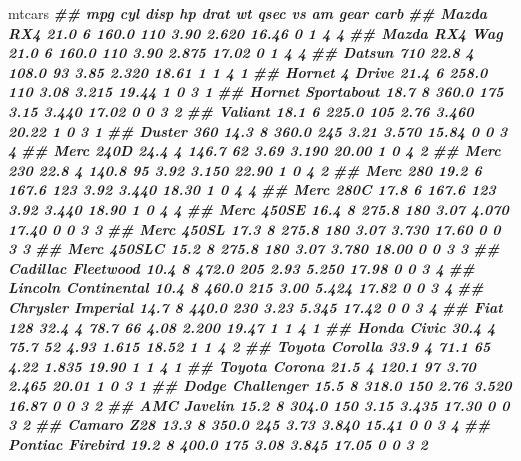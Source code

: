 \documentclass[
]{book}
\newenvironment{Shaded}{\begin{snugshade}}{\end{snugshade}}
\newcommand{\DocumentationTok}[1]{\textcolor[rgb]{0.56,0.35,0.01}{\textbf{\textit{#1}}}}
\newcommand{\NormalTok}[1]{#1}
\begin{document}
\begin{Shaded}
\begin{Highlighting}[]
\NormalTok{mtcars}
\DocumentationTok{\#\#                      mpg cyl  disp  hp drat    wt  qsec vs am gear carb}
\DocumentationTok{\#\# Mazda RX4           21.0   6 160.0 110 3.90 2.620 16.46  0  1    4    4}
\DocumentationTok{\#\# Mazda RX4 Wag       21.0   6 160.0 110 3.90 2.875 17.02  0  1    4    4}
\DocumentationTok{\#\# Datsun 710          22.8   4 108.0  93 3.85 2.320 18.61  1  1    4    1}
\DocumentationTok{\#\# Hornet 4 Drive      21.4   6 258.0 110 3.08 3.215 19.44  1  0    3    1}
\DocumentationTok{\#\# Hornet Sportabout   18.7   8 360.0 175 3.15 3.440 17.02  0  0    3    2}
\DocumentationTok{\#\# Valiant             18.1   6 225.0 105 2.76 3.460 20.22  1  0    3    1}
\DocumentationTok{\#\# Duster 360          14.3   8 360.0 245 3.21 3.570 15.84  0  0    3    4}
\DocumentationTok{\#\# Merc 240D           24.4   4 146.7  62 3.69 3.190 20.00  1  0    4    2}
\DocumentationTok{\#\# Merc 230            22.8   4 140.8  95 3.92 3.150 22.90  1  0    4    2}
\DocumentationTok{\#\# Merc 280            19.2   6 167.6 123 3.92 3.440 18.30  1  0    4    4}
\DocumentationTok{\#\# Merc 280C           17.8   6 167.6 123 3.92 3.440 18.90  1  0    4    4}
\DocumentationTok{\#\# Merc 450SE          16.4   8 275.8 180 3.07 4.070 17.40  0  0    3    3}
\DocumentationTok{\#\# Merc 450SL          17.3   8 275.8 180 3.07 3.730 17.60  0  0    3    3}
\DocumentationTok{\#\# Merc 450SLC         15.2   8 275.8 180 3.07 3.780 18.00  0  0    3    3}
\DocumentationTok{\#\# Cadillac Fleetwood  10.4   8 472.0 205 2.93 5.250 17.98  0  0    3    4}
\DocumentationTok{\#\# Lincoln Continental 10.4   8 460.0 215 3.00 5.424 17.82  0  0    3    4}
\DocumentationTok{\#\# Chrysler Imperial   14.7   8 440.0 230 3.23 5.345 17.42  0  0    3    4}
\DocumentationTok{\#\# Fiat 128            32.4   4  78.7  66 4.08 2.200 19.47  1  1    4    1}
\DocumentationTok{\#\# Honda Civic         30.4   4  75.7  52 4.93 1.615 18.52  1  1    4    2}
\DocumentationTok{\#\# Toyota Corolla      33.9   4  71.1  65 4.22 1.835 19.90  1  1    4    1}
\DocumentationTok{\#\# Toyota Corona       21.5   4 120.1  97 3.70 2.465 20.01  1  0    3    1}
\DocumentationTok{\#\# Dodge Challenger    15.5   8 318.0 150 2.76 3.520 16.87  0  0    3    2}
\DocumentationTok{\#\# AMC Javelin         15.2   8 304.0 150 3.15 3.435 17.30  0  0    3    2}
\DocumentationTok{\#\# Camaro Z28          13.3   8 350.0 245 3.73 3.840 15.41  0  0    3    4}
\DocumentationTok{\#\# Pontiac Firebird    19.2   8 400.0 175 3.08 3.845 17.05  0  0    3    2}

\end{Highlighting}
\end{Shaded}
\end{document}
